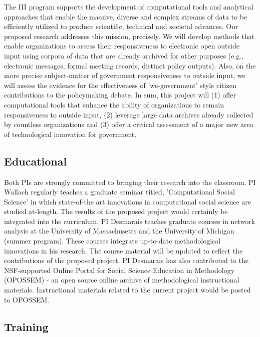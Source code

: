 The III program supports the development of computational tools and analytical approaches that enable the massive, diverse and complex streams of data to be efficiently utilized to produce scientific, technical and societal advances. Our proposed research addresses this mission, precisely. We will develop methods that enable organizations to assess their responsiveness to electronic open outside input using corpora of data that are already archived for other purposes (e.g., electronic messages, formal meeting records, distinct policy outputs). Also, on the more precise subject-matter of government responsiveness to outside input, we will assess the evidence for the effectiveness of 'we-government' style citizen contributions to the policymaking debate. In sum, this project will (1) offer computational tools that enhance the ability of organizations to remain responsiveness to outside input, (2) leverage large data archives already collected by countless organizations and (3) offer a critical assessment of a major new area of technological innovation for government. 

\subsection{Educational}

Both PIs are strongly committed to bringing their research into the classroom. PI Wallach regularly teaches a graduate seminar titled, 'Computational Social Science' in which state-of-the art innovations in computational social science are studied at-length. The results of the proposed project would certainly be integrated into the curriculum. PI Desmarais teaches graduate courses in network analysis at the University of Massachusetts and the University of Michigan (summer program). These courses integrate up-to-date methodological innovations in his research. The course material will be updated to reflect the contributions of the proposed project. PI Desmarais has also contributed to the NSF-supported Online Portal for Social Science Education in Methodology (OPOSSEM) - an open source online archive of methodological instructional materials. Instructional materials related to the current project would be posted to OPOSSEM.

\subsection{Training}

